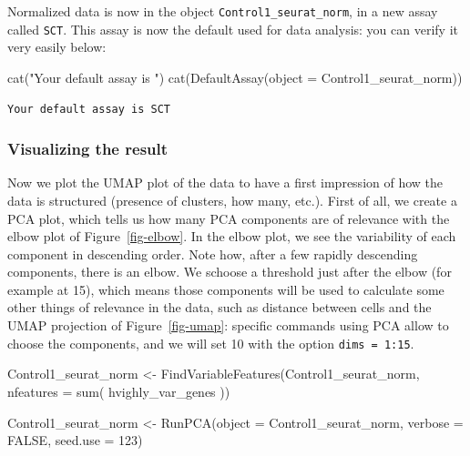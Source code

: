 \documentclass[
  letterpaper,
  DIV=11,
  numbers=noendperiod]{scrartcl}
\newenvironment{Shaded}{}{}
\newcommand{\AttributeTok}[1]{\textcolor[rgb]{0.49,0.56,0.16}{#1}}
\newcommand{\ConstantTok}[1]{\textcolor[rgb]{0.53,0.00,0.00}{#1}}
\newcommand{\DecValTok}[1]{\textcolor[rgb]{0.25,0.63,0.44}{#1}}
\newcommand{\FunctionTok}[1]{\textcolor[rgb]{0.02,0.16,0.49}{#1}}
\newcommand{\NormalTok}[1]{#1}
\newcommand{\OtherTok}[1]{\textcolor[rgb]{0.00,0.44,0.13}{#1}}
\newcommand{\StringTok}[1]{\textcolor[rgb]{0.25,0.44,0.63}{#1}}
\begin{document}
Normalized data is now in the object \texttt{Control1\_seurat\_norm}, in
a new assay called \texttt{SCT}. This assay is now the default used for
data analysis: you can verify it very easily below:

\begin{Shaded}
\begin{Highlighting}[]
\FunctionTok{cat}\NormalTok{(}\StringTok{"Your default assay is "}\NormalTok{)}
\FunctionTok{cat}\NormalTok{(}\FunctionTok{DefaultAssay}\NormalTok{(}\AttributeTok{object =}\NormalTok{ Control1\_seurat\_norm))}
\end{Highlighting}
\end{Shaded}

\begin{verbatim}
Your default assay is SCT
\end{verbatim}

\subsubsection{Visualizing the result}\label{visualizing-the-result}

Now we plot the UMAP plot of the data to have a first impression of how
the data is structured (presence of clusters, how many, etc.). First of
all, we create a PCA plot, which tells us how many PCA components are of
relevance with the elbow plot of Figure~\ref{fig-elbow}. In the elbow
plot, we see the variability of each component in descending order. Note
how, after a few rapidly descending components, there is an elbow. We
schoose a threshold just after the elbow (for example at 15), which
means those components will be used to calculate some other things of
relevance in the data, such as distance between cells and the UMAP
projection of Figure~\ref{fig-umap}: specific commands using PCA allow
to choose the components, and we will set 10 with the option
\texttt{dims\ =\ 1:15}.

\begin{Shaded}
\begin{Highlighting}[]
\NormalTok{Control1\_seurat\_norm }\OtherTok{\textless{}{-}} \FunctionTok{FindVariableFeatures}\NormalTok{(Control1\_seurat\_norm,}
                                                     \AttributeTok{nfeatures =} \FunctionTok{sum}\NormalTok{( hvighly\_var\_genes ))}
\end{Highlighting}
\end{Shaded}

\begin{Shaded}
\begin{Highlighting}[]
\NormalTok{Control1\_seurat\_norm }\OtherTok{\textless{}{-}} \FunctionTok{RunPCA}\NormalTok{(}\AttributeTok{object =}\NormalTok{ Control1\_seurat\_norm, }
                                        \AttributeTok{verbose =} \ConstantTok{FALSE}\NormalTok{, }\AttributeTok{seed.use =} \DecValTok{123}\NormalTok{)}
\end{Highlighting}
\end{Shaded}
\end{document}
